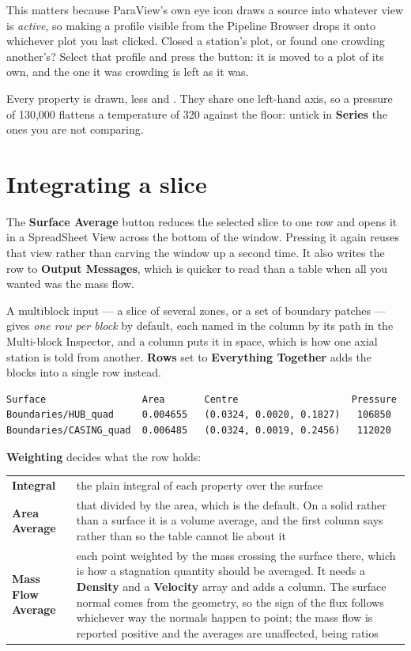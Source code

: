 \documentclass[11pt,a4paper]{article}
\newcommand{\prop}[1]{\textbf{#1}}          %
\newcommand{\menu}[1]{\textbf{#1}}          %
\begin{document}
This matters because ParaView's own eye icon draws a source into whatever view is
\emph{active}, so making a profile visible from the Pipeline Browser drops it
onto whichever plot you last clicked. Closed a station's plot, or found one
crowding another's? Select that profile and press the button: it is moved to a
plot of its own, and the one it was crowding is left as it was.

Every property is drawn, less  and . They share one
left-hand axis, so a pressure of 130{,}000 flattens a temperature of 320 against
the floor: untick in \prop{Series} the ones you are not comparing.

\section{Integrating a slice}

The \menu{Surface Average} button reduces the selected slice to one row and opens
it in a SpreadSheet View across the bottom of the window. Pressing it again
reuses that view rather than carving the window up a second time. It also writes
the row to \menu{Output Messages}, which is quicker to read than a table when all
you wanted was the mass flow.

A multiblock input --- a slice of several zones, or a set of boundary patches ---
gives \emph{one row per block} by default, each named in the 
column by its path in the Multi-block Inspector, and a  column puts
it in space, which is how one axial station is told from another. \prop{Rows} set
to \menu{Everything Together} adds the blocks into a single row instead.

\begin{lstlisting}[style=plain]
Surface                 Area       Centre                    Pressure
Boundaries/HUB_quad     0.004655   (0.0324, 0.0020, 0.1827)   106850
Boundaries/CASING_quad  0.006485   (0.0324, 0.0019, 0.2456)   112020
\end{lstlisting}

\prop{Weighting} decides what the row holds:

\begin{center}
\begin{tabular}{@{}L{40mm}L{86mm}@{}}
\toprule
\menu{Integral} & the plain integral of each property over the surface \\
\menu{Area Average} & that divided by the area, which is the default. On a solid
  rather than a surface it is a volume average, and the first column says
   rather than  so the table cannot lie about it \\
\menu{Mass Flow Average} & each point weighted by the mass crossing the surface
  there, which is how a stagnation quantity should be averaged. It needs a
  \prop{Density} and a \prop{Velocity} array and adds a  column.
  The surface normal comes from the geometry, so the sign of the flux follows
  whichever way the normals happen to point; the mass flow is reported positive
  and the averages are unaffected, being ratios \\
\bottomrule
\end{tabular}
\end{center}
\end{document}
